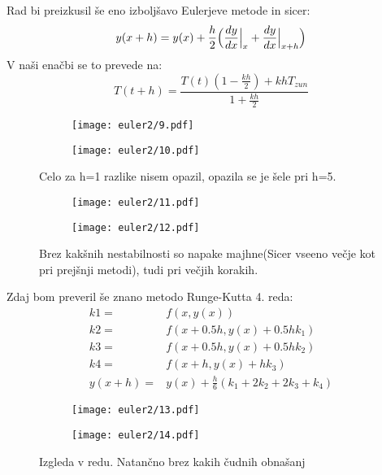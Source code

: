 \documentclass{article}
\begin{document}
Rad bi preizkusil še eno izboljšavo Eulerjeve metode in sicer:
\begin{equation*}
y(x+h) = y(x)+\frac{h}{2}\Big(\frac{dy}{dx}\Big{|}_x + \frac{dy}{dx}\Big{|}_{x+h}\Big)
\end{equation*}
V naši enačbi se to prevede na:
\begin{equation*}
T(t+h) = \frac{T(t) (1-\frac{kh}{2}) + khT_{zun}}{1+\frac{kh}{2}}
\end{equation*}

\begin{figure}[H]
\begin{subfigure}{.5\textwidth}
\texttt{[image: euler2/9.pdf]}
\end{subfigure}
\begin{subfigure}{.5\textwidth}
\texttt{[image: euler2/10.pdf]}
\end{subfigure}
\caption*{Celo za h=1 razlike nisem opazil, opazila se je šele pri h=5.}
\end{figure}
\begin{figure}[H]
\begin{subfigure}{.5\textwidth}
\texttt{[image: euler2/11.pdf]}
\end{subfigure}
\begin{subfigure}{.5\textwidth}
\texttt{[image: euler2/12.pdf]}
\end{subfigure}
\caption*{Brez kakšnih nestabilnosti so napake majhne(Sicer vseeno večje kot pri prejšnji metodi), tudi pri večjih korakih.}
\end{figure}
\newpage
Zdaj bom preveril še znano metodo Runge-Kutta 4. reda:
\begin{align*}
k1 =& f(x,y(x)) \\
k2 =& f(x+0.5h,y(x)+0.5hk_1) \\
k3 =& f(x+0.5h,y(x)+0.5hk_2) \\
k4 =& f(x+h,y(x)+hk_3) \\
y(x+h) =& y(x) + \frac{h}{6} (k_1 + 2k_2 + 2k_3 + k_4) 
\end{align*}

\begin{figure}[H]
\begin{subfigure}{.5\textwidth}
\texttt{[image: euler2/13.pdf]}
\end{subfigure}
\begin{subfigure}{.5\textwidth}
\texttt{[image: euler2/14.pdf]}
\end{subfigure}
\caption*{Izgleda v redu. Natančno brez kakih čudnih obnašanj}
\end{figure}
\end{document}
